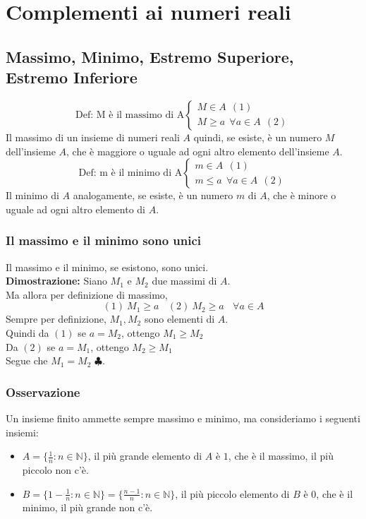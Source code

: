\section{Complementi ai numeri reali}
\subsection{Massimo, Minimo, Estremo Superiore, Estremo Inferiore}
\[
    \text{Def: M è il massimo di A} \begin{cases}
        M \in A  \ \ (1) \\
        M \geq a \ \ \forall a \in A \ \ (2)
    \end{cases}
\]
Il massimo di un insieme di numeri reali $A$ quindi, se esiste, è un numero $M$
dell'insieme $A$, che è maggiore o uguale ad ogni altro elemento dell'insieme
$A$.
\[
    \text{Def: m è il minimo di A} \begin{cases}
        m \in A  \ \ (1) \\
        m \leq a \ \ \forall a \in A \ \ (2)
    \end{cases}
\]
Il minimo di $A$ analogamente, se esiste, è un numero $m$ di $A$, che è minore
o uguale ad ogni altro elemento di $A$.

\subsubsection{Il massimo e il minimo sono unici}
Il massimo e il minimo, se esistono, sono unici.\\ \textbf{Dimostrazione:}
Siano $M_1$ e $M_2$ due massimi di $A$.\\ Ma allora per definizione di massimo,
\[
    (1) \ M_1 \geq a \ \ \ \ (2) \ M_2 \geq a \ \ \ \ \forall a \in A
\]
Sempre per definizione, $M_1, M_2$ sono elementi di $A$.\\ Quindi da $(1)$ se
$a = M_2$, ottengo $M_1 \geq M_2$\\ Da $(2)$ se $a = M_1$, ottengo $M_2 \geq
    M_1$\\ Segue che $M_1 = M_2$ $\clubsuit$.

\subsubsection{Osservazione}
Un insieme finito ammette sempre massimo e minimo, ma consideriamo i seguenti
insiemi:
\begin{itemize}
    \item $A = \{\frac{1}{n} : n\in \mathbb{N}\}$, il più grande elemento di $A$ è $1$, che è il massimo, il più piccolo non c'è.
    \item $B = \{1-\frac{1}{n} : n\in\mathbb{N}\} = \{\frac{n-1}{n} : n\in\mathbb{N}\}$, il più piccolo elemento di $B$ è $0$, che è il minimo, il più grande non c'è.
\end{itemize}

